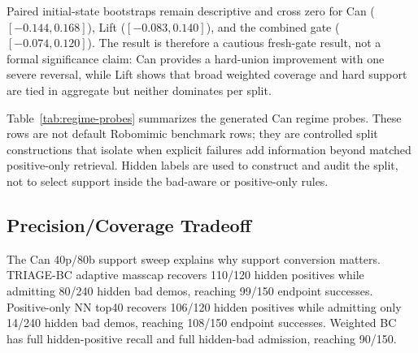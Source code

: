 \documentclass[11pt]{article}
\newcommand{\method}{TRIAGE-BC}
\begin{document}
Paired initial-state bootstraps remain descriptive and cross zero for Can ($[-0.144,0.168]$), Lift ($[-0.083,0.140]$), and the combined gate ($[-0.074,0.120]$). The result is therefore a cautious fresh-gate result, not a formal significance claim: Can provides a hard-union improvement with one severe reversal, while Lift shows that broad weighted coverage and hard support are tied in aggregate but neither dominates per split.

Table~\ref{tab:regime-probes} summarizes the generated Can regime probes. These rows are not default Robomimic benchmark rows; they are controlled split constructions that isolate when explicit failures add information beyond matched positive-only retrieval. Hidden labels are used to construct and audit the split, not to select support inside the bad-aware or positive-only rules.

\begin{table}[t]
  \centering
  \scriptsize
  \setlength{\tabcolsep}{3pt}
  \caption{Generated Can regime-probe summary. Counts are 50 endpoint rollouts per split over seeds 101/202/303; support entries are selected hidden-positive/hidden-bad demos for bad-aware versus matched positive-only retrieval.}
  \label{tab:regime-probes}
\end{table}

\subsection{Precision/Coverage Tradeoff}

The Can 40p/80b support sweep explains why support conversion matters. \method{} adaptive masscap recovers 110/120 hidden positives while admitting 80/240 hidden bad demos, reaching 99/150 endpoint successes. Positive-only NN top40 recovers 106/120 hidden positives while admitting only 14/240 hidden bad demos, reaching 108/150 endpoint successes. Weighted BC has full hidden-positive recall and full hidden-bad admission, reaching 90/150.
\end{document}
